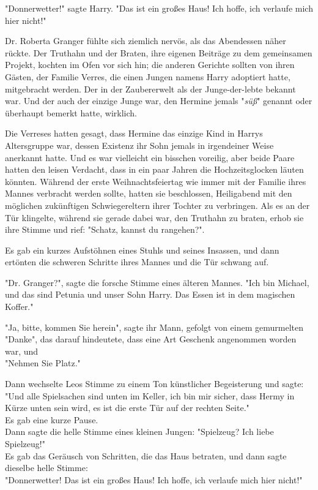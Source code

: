 {"Donnerwetter!" sagte Harry. "Das ist ein großes Haus! Ich hoffe, ich verlaufe mich hier nicht!"

Dr. Roberta Granger fühlte sich ziemlich nervös, als das Abendessen näher rückte. Der Truthahn und der Braten, ihre eigenen Beiträge zu dem gemeinsamen Projekt, kochten im Ofen vor sich hin; die anderen Gerichte sollten von ihren Gästen, der Familie Verres, die einen Jungen namens Harry adoptiert hatte, mitgebracht werden. Der in der Zaubererwelt als der Junge-der-lebte bekannt war. Und der auch der einzige Junge war, den Hermine jemals "\emph{süß}" genannt oder überhaupt bemerkt hatte, wirklich.

Die Verreses hatten gesagt, dass Hermine das einzige Kind in Harrys Altersgruppe war, dessen Existenz ihr Sohn jemals in irgendeiner Weise anerkannt hatte. Und es war vielleicht ein bisschen voreilig, aber beide Paare hatten den leisen Verdacht, dass in ein paar Jahren die Hochzeitsglocken läuten könnten. Während der erste Weihnachtsfeiertag wie immer mit der Familie ihres Mannes verbracht werden sollte, hatten sie beschlossen, Heiligabend mit den möglichen zukünftigen Schwiegereltern ihrer Tochter zu verbringen. Als es an der Tür klingelte, während sie gerade dabei war, den Truthahn zu braten, erhob sie ihre Stimme und rief: "Schatz, kannst du rangehen?".

Es gab ein kurzes Aufstöhnen eines Stuhls und seines Insassen, und dann ertönten die schweren Schritte ihres Mannes und die Tür schwang auf.

"Dr. Granger?", sagte die forsche Stimme eines älteren Mannes. "Ich bin Michael, und das sind Petunia und unser Sohn Harry. Das Essen ist in dem magischen Koffer."

"Ja, bitte, kommen Sie herein", sagte ihr Mann, gefolgt von einem gemurmelten\\ "Danke", das darauf hindeutete, dass eine Art Geschenk angenommen worden war, und\\ "Nehmen Sie Platz."

Dann wechselte Leos Stimme zu einem Ton künstlicher Begeisterung und sagte:\\ "Und alle Spielsachen sind unten im Keller, ich bin mir sicher, dass Hermy in Kürze unten sein wird, es ist die erste Tür auf der rechten Seite."\\ Es gab eine kurze Pause.\\ Dann sagte die helle Stimme eines kleinen Jungen: "Spielzeug? Ich liebe Spielzeug!"\\ Es gab das Geräusch von Schritten, die das Haus betraten, und dann sagte dieselbe helle Stimme:\\ "Donnerwetter! Das ist ein großes Haus! Ich hoffe, ich verlaufe mich hier nicht!"

}
